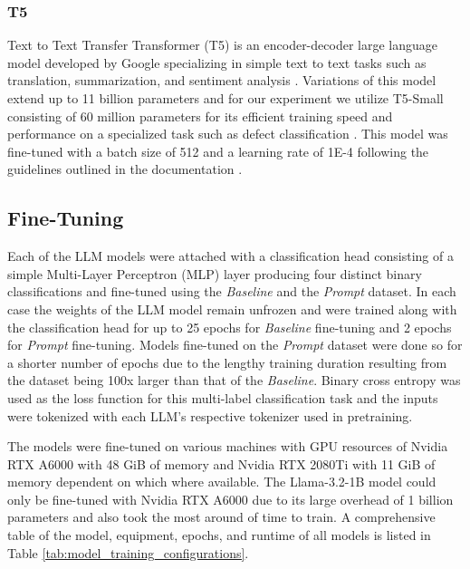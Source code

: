 \subsubsection{T5}
Text to Text Transfer Transformer (T5) is an encoder-decoder large language
model developed by Google specializing in simple text to text tasks such as
translation, summarization, and sentiment analysis \cite{raffel_exploring_2023}.
Variations of this model extend up to 11 billion parameters and for our
experiment we utilize T5-Small \cite{raffel_exploring_2023} consisting of 60
million parameters for its efficient training speed and performance on a
specialized task such as defect classification \cite{raffel_exploring_2023}.
This model was fine-tuned with a batch size of 512 and a learning rate of 1E-4
following the guidelines outlined in the documentation
\cite{raffel_exploring_2023}.

\subsection{Fine-Tuning}
Each of the LLM models were attached with a classification head consisting of a
simple Multi-Layer Perceptron (MLP) layer producing four distinct binary
classifications and fine-tuned using the \textit{Baseline} and the
\textit{Prompt} dataset. In each case the weights of the LLM model remain
unfrozen and were trained along with the classification head for up to 25 epochs
for \textit{Baseline} fine-tuning and 2 epochs for \textit{Prompt} fine-tuning.
Models fine-tuned on the \textit{Prompt} dataset were done so for a shorter
number of epochs due to the lengthy training duration resulting from the dataset
being 100x larger than that of the \textit{Baseline}. Binary cross entropy was
used as the loss function for this multi-label classification task and the
inputs were tokenized with each LLM's respective tokenizer used in pretraining.

The models were fine-tuned on various
machines with GPU resources of Nvidia RTX A6000 with 48 GiB of memory and Nvidia
RTX 2080Ti with 11 GiB of memory dependent on which where available. The
Llama-3.2-1B model could only be fine-tuned with Nvidia RTX A6000 due to its
large overhead of 1 billion parameters and also took the most around of time to
train. A comprehensive table of the model, equipment, epochs, and runtime of all
models is listed in Table \ref{tab:model_training_configurations}.


